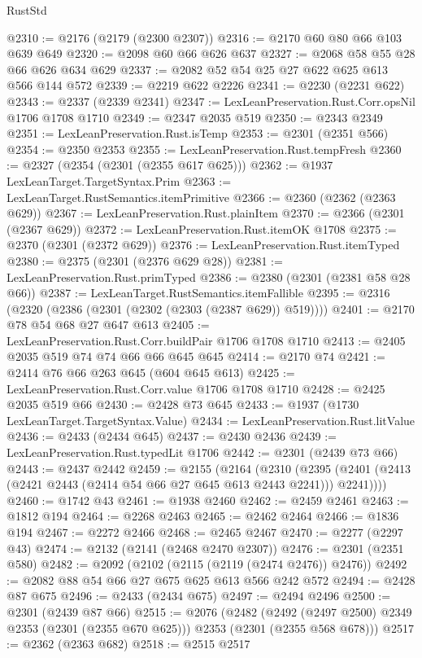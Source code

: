 \begin{lexlean}{RustStd}
\begin{coremodule}
@2310 := @2176 (@2179 (@2300 @2307))
@2316 := @2170 @60 @80 @66 @103 @639 @649
@2320 := @2098 @60 @66 @626 @637
@2327 := @2068 @58 @55 @28 @66 @626 @634 @629
@2337 := @2082 @52 @54 @25 @27 @622 @625 @613 @566 @144 @572
@2339 := @2219 @622 @2226
@2341 := @2230 (@2231 @622)
@2343 := @2337 (@2339 @2341)
@2347 := LexLeanPreservation.Rust.Corr.opsNil @1706 @1708 @1710
@2349 := @2347 @2035 @519
@2350 := @2343 @2349
@2351 := LexLeanPreservation.Rust.isTemp
@2353 := @2301 (@2351 @566)
@2354 := @2350 @2353
@2355 := LexLeanPreservation.Rust.tempFresh
@2360 := @2327 (@2354 (@2301 (@2355 @617 @625)))
@2362 := @1937 LexLeanTarget.TargetSyntax.Prim
@2363 := LexLeanTarget.RustSemantics.itemPrimitive
@2366 := @2360 (@2362 (@2363 @629))
@2367 := LexLeanPreservation.Rust.plainItem
@2370 := @2366 (@2301 (@2367 @629))
@2372 := LexLeanPreservation.Rust.itemOK @1708
@2375 := @2370 (@2301 (@2372 @629))
@2376 := LexLeanPreservation.Rust.itemTyped
@2380 := @2375 (@2301 (@2376 @629 @28))
@2381 := LexLeanPreservation.Rust.primTyped
@2386 := @2380 (@2301 (@2381 @58 @28 @66))
@2387 := LexLeanTarget.RustSemantics.itemFallible
@2395 := @2316 (@2320 (@2386 (@2301 (@2302 (@2303 (@2387 @629)) @519))))
@2401 := @2170 @78 @54 @68 @27 @647 @613
@2405 := LexLeanPreservation.Rust.Corr.buildPair @1706 @1708 @1710
@2413 := @2405 @2035 @519 @74 @74 @66 @66 @645 @645
@2414 := @2170 @74
@2421 := @2414 @76 @66 @263 @645 (@604 @645 @613)
@2425 := LexLeanPreservation.Rust.Corr.value @1706 @1708 @1710
@2428 := @2425 @2035 @519 @66
@2430 := @2428 @73 @645
@2433 := @1937 (@1730 LexLeanTarget.TargetSyntax.Value)
@2434 := LexLeanPreservation.Rust.litValue
@2436 := @2433 (@2434 @645)
@2437 := @2430 @2436
@2439 := LexLeanPreservation.Rust.typedLit @1706
@2442 := @2301 (@2439 @73 @66)
@2443 := @2437 @2442
@2459 := @2155
    (@2164
      (@2310 (@2395 (@2401 (@2413 (@2421 @2443 (@2414 @54 @66 @27 @645 @613 @2443 @2241))) @2241))))
@2460 := @1742 @43
@2461 := @1938 @2460
@2462 := @2459 @2461
@2463 := @1812 @194
@2464 := @2268 @2463
@2465 := @2462 @2464
@2466 := @1836 @194
@2467 := @2272 @2466
@2468 := @2465 @2467
@2470 := @2277 (@2297 @43)
@2474 := @2132 (@2141 (@2468 @2470 @2307))
@2476 := @2301 (@2351 @580)
@2482 := @2092 (@2102 (@2115 (@2119 (@2474 @2476)) @2476))
@2492 := @2082 @88 @54 @66 @27 @675 @625 @613 @566 @242 @572
@2494 := @2428 @87 @675
@2496 := @2433 (@2434 @675)
@2497 := @2494 @2496
@2500 := @2301 (@2439 @87 @66)
@2515 := @2076
    (@2482
      (@2492 (@2497 @2500) @2349 @2353 (@2301 (@2355 @670 @625)))
      @2353
      (@2301 (@2355 @568 @678)))
@2517 := @2362 (@2363 @682)
@2518 := @2515 @2517

\end{coremodule}
\end{lexlean}
